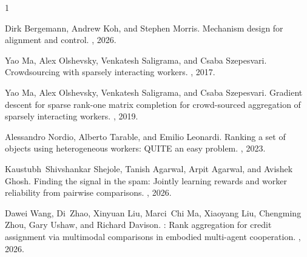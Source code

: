 \documentclass{article}
\begin{document}
\begin{thebibliography}{1}

Dirk Bergemann, Andrew Koh, and Stephen Morris.
\newblock Mechanism design for alignment and control.
, 2026.

Yao Ma, Alex Olshevsky, Venkatesh Saligrama, and Csaba Szepesvari.
\newblock Crowdsourcing with sparsely interacting workers.
, 2017.

Yao Ma, Alex Olshevsky, Venkatesh Saligrama, and Csaba Szepesvari.
\newblock Gradient descent for sparse rank-one matrix completion for
  crowd-sourced aggregation of sparsely interacting workers.
, 2019.

Alessandro Nordio, Alberto Tarable, and Emilio Leonardi.
\newblock Ranking a set of objects using heterogeneous workers: {QUITE} an easy
  problem.
, 2023.

Kaustubh~Shivshankar Shejole, Tanish Agarwal, Arpit Agarwal, and Avishek Ghosh.
\newblock Finding the signal in the spam: Jointly learning rewards and worker
  reliability from pairwise comparisons.
, 2026.

Dawei Wang, Di~Zhao, Xinyuan Liu, Marci~Chi Ma, Xiaoyang Liu, Chengming Zhou,
  Gary Ushaw, and Richard Davison.
: Rank aggregation for credit assignment via multimodal
  comparisons in embodied multi-agent cooperation.
, 2026.

\end{thebibliography}
\end{document}
